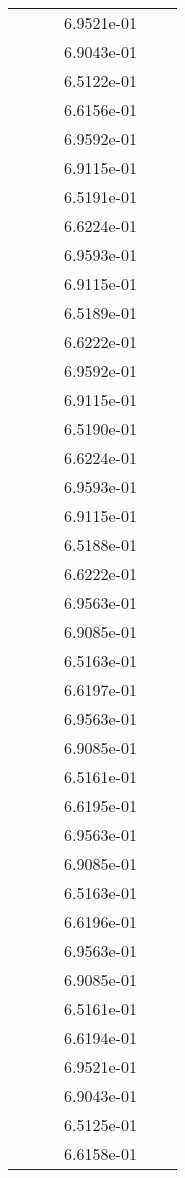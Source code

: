 \begin{xltabular}{\textwidth}{r|rS[table-format=1.3e+2]S[table-format=1.4e+2]S[table-format=1.4e+2]S[table-format=-1.5]}
&  &  & 6.9521e-01 & & \\
&  &  & 6.9043e-01 & & \\
&  &  & 6.5122e-01 & & \\
&  &  & 6.6156e-01 & & \\
&  &  & 6.9592e-01 & & \\
&  &  & 6.9115e-01 & & \\
&  &  & 6.5191e-01 & & \\
&  &  & 6.6224e-01 & & \\
&  &  & 6.9593e-01 & & \\
&  &  & 6.9115e-01 & & \\
&  &  & 6.5189e-01 & & \\
&  &  & 6.6222e-01 & & \\
&  &  & 6.9592e-01 & & \\
&  &  & 6.9115e-01 & & \\
&  &  & 6.5190e-01 & & \\
&  &  & 6.6224e-01 & & \\
&  &  & 6.9593e-01 & & \\
&  &  & 6.9115e-01 & & \\
&  &  & 6.5188e-01 & & \\
&  &  & 6.6222e-01 & & \\
&  &  & 6.9563e-01 & & \\
&  &  & 6.9085e-01 & & \\
&  &  & 6.5163e-01 & & \\
&  &  & 6.6197e-01 & & \\
&  &  & 6.9563e-01 & & \\
&  &  & 6.9085e-01 & & \\
&  &  & 6.5161e-01 & & \\
&  &  & 6.6195e-01 & & \\
&  &  & 6.9563e-01 & & \\
&  &  & 6.9085e-01 & & \\
&  &  & 6.5163e-01 & & \\
&  &  & 6.6196e-01 & & \\
&  &  & 6.9563e-01 & & \\
&  &  & 6.9085e-01 & & \\
&  &  & 6.5161e-01 & & \\
&  &  & 6.6194e-01 & & \\
&  &  & 6.9521e-01 & & \\
&  &  & 6.9043e-01 & & \\
&  &  & 6.5125e-01 & & \\
&  &  & 6.6158e-01 & & \\

\end{xltabular}
